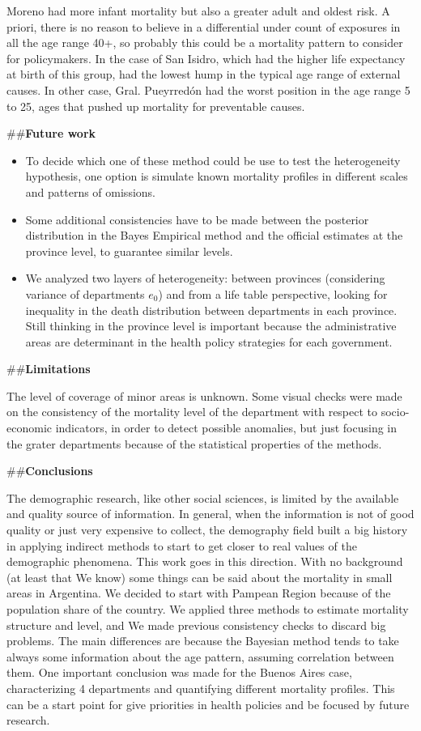 \documentclass[12pt,]{article}
\begin{document}
Moreno had more infant mortality but also a greater adult and oldest
risk. A priori, there is no reason to believe in a differential under
count of exposures in all the age range 40+, so probably this could be a
mortality pattern to consider for policymakers. In the case of San
Isidro, which had the higher life expectancy at birth of this group, had
the lowest hump in the typical age range of external causes. In other
case, Gral. Pueyrredón had the worst position in the age range 5 to 25,
ages that pushed up mortality for preventable causes.

\#\#\textbf{Future work}

\begin{itemize}
\item
  To decide which one of these method could be use to test the
  heterogeneity hypothesis, one option is simulate known mortality
  profiles in different scales and patterns of omissions.
\item
  Some additional consistencies have to be made between the posterior
  distribution in the Bayes Empirical method and the official estimates
  at the province level, to guarantee similar levels.
\item
  We analyzed two layers of heterogeneity: between provinces
  (considering variance of departments \(e_0\)) and from a life table
  perspective, looking for inequality in the death distribution between
  departments in each province. Still thinking in the province level is
  important because the administrative areas are determinant in the
  health policy strategies for each government.
\end{itemize}

\#\#\textbf{Limitations}

The level of coverage of minor areas is unknown. Some visual checks were
made on the consistency of the mortality level of the department with
respect to socio-economic indicators, in order to detect possible
anomalies, but just focusing in the grater departments because of the
statistical properties of the methods.

\#\#\textbf{Conclusions}

The demographic research, like other social sciences, is limited by the
available and quality source of information. In general, when the
information is not of good quality or just very expensive to collect,
the demography field built a big history in applying indirect methods to
start to get closer to real values of the demographic phenomena. This
work goes in this direction. With no background (at least that We know)
some things can be said about the mortality in small areas in Argentina.
We decided to start with Pampean Region because of the population share
of the country. We applied three methods to estimate mortality structure
and level, and We made previous consistency checks to discard big
problems. The main differences are because the Bayesian method tends to
take always some information about the age pattern, assuming correlation
between them. One important conclusion was made for the Buenos Aires
case, characterizing 4 departments and quantifying different mortality
profiles. This can be a start point for give priorities in health
policies and be focused by future research.
\end{document}
